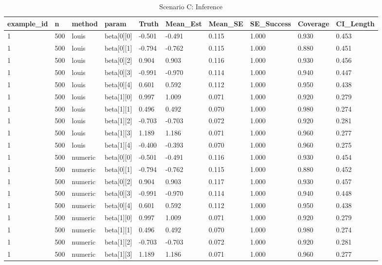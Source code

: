 \begin{table}
\caption{Scenario C: Inference}
\label{tab:scen\_c}
\begin{tabular}{llllllllll}
\toprule
example\_id & n & method & param & Truth & Mean\_Est & Mean\_SE & SE\_Success & Coverage & CI\_Length \\
\midrule
1 & 500 & louis & beta[0][0] & -0.501 & -0.491 & 0.115 & 1.000 & 0.930 & 0.453 \\
1 & 500 & louis & beta[0][1] & -0.794 & -0.762 & 0.115 & 1.000 & 0.880 & 0.451 \\
1 & 500 & louis & beta[0][2] & 0.904 & 0.903 & 0.116 & 1.000 & 0.930 & 0.456 \\
1 & 500 & louis & beta[0][3] & -0.991 & -0.970 & 0.114 & 1.000 & 0.940 & 0.447 \\
1 & 500 & louis & beta[0][4] & 0.601 & 0.592 & 0.112 & 1.000 & 0.950 & 0.438 \\
1 & 500 & louis & beta[1][0] & 0.997 & 1.009 & 0.071 & 1.000 & 0.920 & 0.279 \\
1 & 500 & louis & beta[1][1] & 0.496 & 0.492 & 0.070 & 1.000 & 0.980 & 0.274 \\
1 & 500 & louis & beta[1][2] & -0.703 & -0.703 & 0.072 & 1.000 & 0.920 & 0.281 \\
1 & 500 & louis & beta[1][3] & 1.189 & 1.186 & 0.071 & 1.000 & 0.960 & 0.277 \\
1 & 500 & louis & beta[1][4] & -0.400 & -0.393 & 0.070 & 1.000 & 0.960 & 0.275 \\
1 & 500 & numeric & beta[0][0] & -0.501 & -0.491 & 0.116 & 1.000 & 0.930 & 0.454 \\
1 & 500 & numeric & beta[0][1] & -0.794 & -0.762 & 0.115 & 1.000 & 0.880 & 0.452 \\
1 & 500 & numeric & beta[0][2] & 0.904 & 0.903 & 0.117 & 1.000 & 0.930 & 0.457 \\
1 & 500 & numeric & beta[0][3] & -0.991 & -0.970 & 0.114 & 1.000 & 0.940 & 0.448 \\
1 & 500 & numeric & beta[0][4] & 0.601 & 0.592 & 0.112 & 1.000 & 0.950 & 0.438 \\
1 & 500 & numeric & beta[1][0] & 0.997 & 1.009 & 0.071 & 1.000 & 0.920 & 0.279 \\
1 & 500 & numeric & beta[1][1] & 0.496 & 0.492 & 0.070 & 1.000 & 0.980 & 0.274 \\
1 & 500 & numeric & beta[1][2] & -0.703 & -0.703 & 0.072 & 1.000 & 0.920 & 0.281 \\
1 & 500 & numeric & beta[1][3] & 1.189 & 1.186 & 0.071 & 1.000 & 0.960 & 0.277 \\

\end{tabular}
\end{table}
